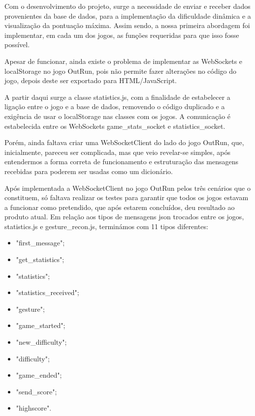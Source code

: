 \documentclass{TTUPhD}
\begin{document}
Com o desenvolvimento do projeto, surge a necessidade de enviar e receber dados provenientes da base de dados, para a implementação da dificuldade dinâmica e a visualização da pontuação máxima. Assim sendo, a nossa primeira abordagem foi implementar, em cada um dos jogos, as funções requeridas para que isso fosse possível.

Apesar de funcionar, ainda existe o problema de implementar as WebSockets e localStorage no jogo OutRun, pois não permite fazer alterações no código do jogo, depois deste ser exportado para HTML/JavaScript.

A partir daqui surge a classe statistics.js, com a finalidade de estabelecer a ligação entre o jogo e a base de dados, removendo o código duplicado e a exigência de usar o localStorage nas classes com os jogos. A comunicação é estabelecida entre os WebSockets game\_stats\_socket e statistics\_socket.

Porém, ainda faltava criar uma WebSocketClient do lado do jogo OutRun, que, inicialmente, pareceu ser complicada, mas que veio revelar-se simples, após entendermos a forma correta de funcionamento e estruturação das mensagens recebidas para poderem ser usadas como um dicionário.

\newpage

Após implementada a WebSocketClient no jogo OutRun pelos três cenários que o constituem, só faltava realizar os testes para garantir que todos os jogos estavam a funcionar como pretendido, que após estarem concluídos, deu resultado ao produto atual. Em relação aos tipos de mensagens json trocados entre os jogos, statistics.js e gesture\_recon.js, terminámos com 11 tipos diferentes:

\begin{itemize}
    \item "first\_message";
    \item "get\_statistics";
    \item "statistics";
    \item "statistics\_received";
    \item "gesture";
    \item "game\_started";
    \item "new\_difficulty";
    \item "difficulty";
    \item "game\_ended";
    \item "send\_score";
    \item "highscore".
\end{itemize}
\end{document}

